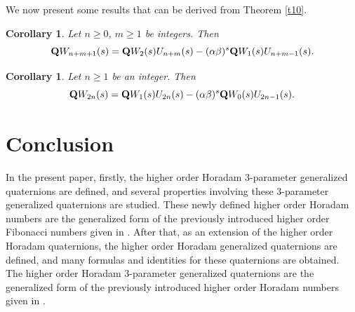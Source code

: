 \documentclass{kms-c}
\theoremstyle{plain}
\newtheorem{corollary}[theorem]{Corollary}
\theoremstyle{definition}
\theoremstyle{remark}
\begin{document}
We now present some results that can be derived from Theorem \ref{t10}.
\begin{corollary}
Let $n\geq 0$, $m\geq 1$ be integers. Then
\[
\textnormal{\textbf{Q}}W_{n+m+1}(s)=\textnormal{\textbf{Q}}W_{2}(s)U_{n+m}(s)-(\alpha\beta)^{s}\textnormal{\textbf{Q}}W_{1}(s)U_{n+m-1}(s).
\]
\end{corollary}

\begin{corollary}
Let $n\geq 1$ be an integer. Then
\[
\textnormal{\textbf{Q}}W_{2n}(s)=\textnormal{\textbf{Q}}W_{1}(s)U_{2n}(s)-(\alpha\beta)^{s}\textnormal{\textbf{Q}}W_{0}(s)U_{2n-1}(s).
\]
\end{corollary}

\section{Conclusion}
In the present paper, firstly, the higher order Horadam 3-parameter generalized quaternions are defined, and several properties involving these 3-parameter generalized quaternions are studied. These newly defined higher order Horadam numbers are the generalized form of the previously introduced higher order Fibonacci numbers given in \cite{Ki1,Ki2,Ki3}. After that, as an extension of the higher order Horadam quaternions, the higher order Horadam generalized quaternions are defined, and many formulas and identities for these quaternions are obtained. The higher order Horadam 3-parameter generalized quaternions are the generalized form of the previously introduced higher order Horadam numbers given in \cite{Kul}.
\end{document}
